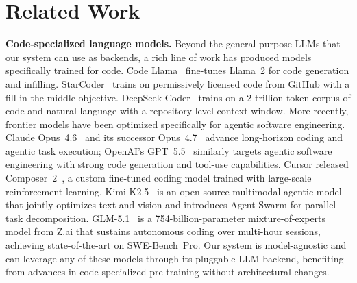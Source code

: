 \documentclass{article}
\begin{document}
\section{Related Work}
\label{sec:related}

\textbf{Code-specialized language models.} Beyond the general-purpose LLMs that our system can use as backends, a rich line of work has produced models specifically trained for code. Code Llama~\citep{roziere2023code} fine-tunes Llama~2 for code generation and infilling. StarCoder~\citep{li2023starcoder} trains on permissively licensed code from GitHub with a fill-in-the-middle objective. DeepSeek-Coder~\citep{guo2024deepseek} trains on a 2-trillion-token corpus of code and natural language with a repository-level context window. More recently, frontier models have been optimized specifically for agentic software engineering. Claude Opus~4.6~\citep{anthropic2026opus46} and its successor Opus~4.7~\citep{anthropic2026opus47} advance long-horizon coding and agentic task execution; OpenAI's GPT~5.5~\citep{openai2026gpt55} similarly targets agentic software engineering with strong code generation and tool-use capabilities. Cursor released Composer~2~\citep{cursor2026composer2}, a custom fine-tuned coding model trained with large-scale reinforcement learning. Kimi K2.5~\citep{kimiteam2026k25} is an open-source multimodal agentic model that jointly optimizes text and vision and introduces Agent Swarm for parallel task decomposition. GLM-5.1~\citep{zai2026glm51} is a 754-billion-parameter mixture-of-experts model from Z.ai that sustains autonomous coding over multi-hour sessions, achieving state-of-the-art on SWE-Bench~Pro. Our system is model-agnostic and can leverage any of these models through its pluggable LLM backend, benefiting from advances in code-specialized pre-training without architectural changes.
\end{document}
